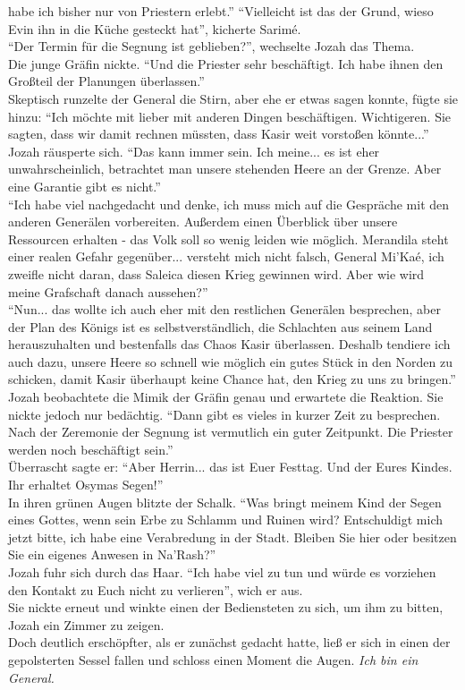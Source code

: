habe ich bisher nur von Priestern erlebt.''
``Vielleicht ist das der Grund, wieso Evin ihn in die Küche gesteckt hat'', kicherte Sarimé.\\
``Der Termin für die Segnung ist geblieben?'', wechselte Jozah das Thema.\\
Die junge Gräfin nickte. ``Und die Priester sehr beschäftigt. Ich habe ihnen den Großteil der 
Planungen überlassen.''\\
Skeptisch runzelte der General die Stirn, aber ehe er etwas sagen konnte, fügte sie hinzu: ``Ich 
möchte mit lieber mit anderen Dingen beschäftigen. Wichtigeren. Sie sagten, dass wir damit rechnen 
müssten, dass Kasir weit vorstoßen könnte...''\\
Jozah räusperte sich. ``Das kann immer sein. Ich meine... es ist eher unwahrscheinlich, betrachtet 
man unsere stehenden Heere an der Grenze. Aber eine Garantie gibt es nicht.''\\
``Ich habe viel nachgedacht und denke, ich muss mich auf die Gespräche mit den anderen Generälen 
vorbereiten. Außerdem einen Überblick über unsere Ressourcen erhalten - das Volk soll so wenig 
leiden wie möglich. Merandila steht einer realen Gefahr gegenüber... versteht mich nicht falsch, 
General Mi'Kaé, ich zweifle nicht daran, dass Saleica diesen Krieg gewinnen wird. Aber wie wird 
meine Grafschaft danach aussehen?''\\
``Nun... das wollte ich auch eher mit den restlichen Generälen besprechen, aber der Plan des Königs 
ist es selbstverständlich, die Schlachten aus seinem Land herauszuhalten und bestenfalls das Chaos 
Kasir überlassen. Deshalb tendiere ich auch dazu, unsere Heere so schnell wie möglich ein gutes 
Stück in den Norden zu schicken, damit Kasir überhaupt keine Chance hat, den Krieg zu uns zu 
bringen.''\\
Jozah beobachtete die Mimik der Gräfin genau und erwartete die Reaktion. Sie nickte jedoch nur 
bedächtig. ``Dann gibt es vieles in kurzer Zeit zu besprechen. Nach der Zeremonie der Segnung ist 
vermutlich ein guter Zeitpunkt. Die Priester werden noch beschäftigt sein.''\\
Überrascht sagte er: ``Aber Herrin... das ist Euer Festtag. Und der Eures Kindes. Ihr erhaltet 
Osymas Segen!''\\
In ihren grünen Augen blitzte der Schalk. ``Was bringt meinem Kind der Segen eines Gottes, wenn 
sein Erbe zu Schlamm und Ruinen wird? Entschuldigt mich jetzt bitte, ich habe eine Verabredung in 
der Stadt. Bleiben Sie hier oder besitzen Sie ein eigenes Anwesen in Na'Rash?''\\
Jozah fuhr sich durch das Haar. ``Ich habe viel zu tun und würde es vorziehen den Kontakt zu Euch 
nicht zu verlieren'', wich er aus.\\
Sie nickte erneut und winkte einen der Bediensteten zu sich, um ihm zu bitten, Jozah ein Zimmer zu 
zeigen.\\
Doch deutlich erschöpfter, als er zunächst gedacht hatte, ließ er sich in einen der gepolsterten 
Sessel fallen und schloss einen Moment die Augen. \textit{Ich bin ein General.}\\


